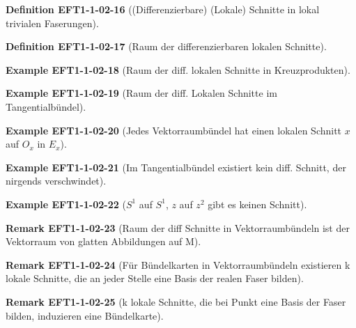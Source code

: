 \documentclass[10pt, letterpaper]{article}
\newcommand{\CustomHeading}[3]{%
  \par\medskip\noindent%
  \textbf{#1 #2} \textnormal{(#3)}.\enskip%
}
\newenvironment{DEF}[2]{\CustomHeading{Definition}{#1}{#2}}{}
\newenvironment{REM}[2]{\CustomHeading{Remark}{#1}{#2}}{}
\newenvironment{EXA}[2]{\CustomHeading{Example}{#1}{#2}}{}
\begin{document}
\begin{DEF}{EFT1-1-02-16}{(Differenzierbare) (Lokale) Schnitte in lokal trivialen Faserungen}
\end{DEF}

\begin{DEF}{EFT1-1-02-17}{Raum der differenzierbaren lokalen Schnitte}
\end{DEF}

\begin{EXA}{EFT1-1-02-18}{Raum der diff. lokalen Schnitte in Kreuzprodukten}
\end{EXA}

\begin{EXA}{EFT1-1-02-19}{Raum der diff. Lokalen Schnitte im Tangentialbündel}
\end{EXA}

\begin{EXA}{EFT1-1-02-20}{Jedes Vektorraumbündel hat einen lokalen Schnitt $x$ auf $O_x$ in $E_x$}
\end{EXA}

\begin{EXA}{EFT1-1-02-21}{Im Tangentialbündel existiert kein diff. Schnitt, der nirgends verschwindet}
\end{EXA}

\begin{EXA}{EFT1-1-02-22}{$S^1$ auf $S^1$, $z$ auf $z^2$ gibt es keinen Schnitt}
\end{EXA}

\begin{REM}{EFT1-1-02-23}{Raum der diff Schnitte in Vektorraumbündeln ist der Vektorraum von glatten Abbildungen auf M}
\end{REM}

\begin{REM}{EFT1-1-02-24}{Für Bündelkarten in Vektorraumbündeln existieren k lokale Schnitte, die an jeder Stelle eine Basis der realen Faser bilden}
\end{REM}

\begin{REM}{EFT1-1-02-25}{k lokale Schnitte, die bei Punkt eine Basis der Faser bilden, induzieren eine Bündelkarte}
\end{REM}
\end{document}
